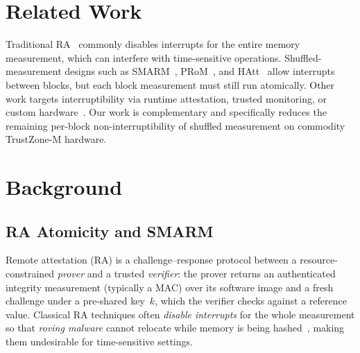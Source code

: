 \documentclass[conference]{IEEEtran}
\newcommand\oak[1]{\textcolor{red}{OAK: #1}}
\begin{document}
\section{Related Work}
\label{sec:related}

Traditional RA~\cite{eldefrawy2012smart,nunes2019vrased,eldefrawy2017hydra} commonly disables interrupts for the entire memory measurement, which can interfere with time-sensitive operations. Shuffled-measurement designs such as SMARM~\cite{carpent2018smarm}, PRoM~\cite{aman2021prom}, and HAtt~\cite{aman2018hatt} allow interrupts between blocks, but each block measurement must still run atomically. Other work targets interruptibility via runtime attestation, trusted monitoring, or custom hardware~\cite{isc-flat,asap,ida2024,lo-fat,litehax,atrium}. Our work is complementary and specifically reduces the remaining per-block non-interruptibility of shuffled measurement on commodity TrustZone-M hardware.


\section{Background}
\label{sec:background}

\subsection{RA Atomicity and SMARM}

Remote attestation (RA) is a challenge--response protocol between a resource-constrained \emph{prover} and a trusted \emph{verifier}: the prover returns an authenticated integrity measurement (typically a MAC) over its software image and a fresh challenge under a pre-shared key~$k$, which the verifier checks against a reference value. Classical RA techniques often \emph{disable interrupts} for the whole measurement so that \emph{roving malware} cannot relocate while memory is being hashed~\cite{eldefrawy2012smart,nunes2019vrased}, making them undesirable for time-sensitive settings.
\end{document}
